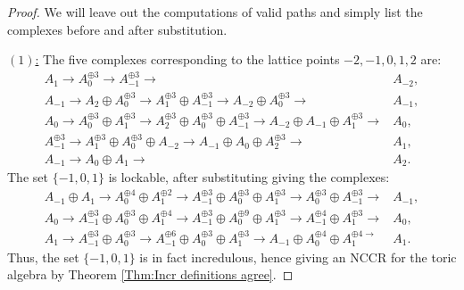 \documentclass[reqno, 12pt]{amsart}
\theoremstyle{definition}
\numberwithin{equation}{section}
\begin{document}
\begin{proof}
We will leave out the computations of valid paths and simply list the complexes before and after substitution.

\underline{$(1)$:} The five complexes corresponding to the lattice points $-2,-1,0,1,2$ are:\begin{align*}
 A_1\longrightarrow A_0^{\oplus 3}\longrightarrow A_{-1}^{\oplus 3}\longrightarrow&A_{-2},\\
A_{-1}\longrightarrow A_2\oplus A_0^{\oplus 3}\longrightarrow A_1^{\oplus 3}\oplus A_{-1}^{\oplus 3}\longrightarrow A_{-2}\oplus A_0^{\oplus 3}\longrightarrow&A_{-1},\\
A_0\longrightarrow A_0^{\oplus 3}\oplus A_1^{\oplus 3}\longrightarrow A_2^{\oplus 3}\oplus A_0^{\oplus 3}\oplus A_{-1}^{\oplus 3}\longrightarrow A_{-2}\oplus A_{-1}\oplus A_1^{\oplus 3}\longrightarrow&A_0,\\
 A_{-1}^{\oplus 3}\longrightarrow A_1^{\oplus 3}\oplus A_0^{\oplus 3}\oplus A_{-2}\longrightarrow A_{-1}\oplus A_0\oplus A_2^{\oplus 3}\longrightarrow&A_1,\\
 A_{-1}\longrightarrow A_0\oplus A_1\longrightarrow&A_2.
\end{align*} 
The set $\{-1,0,1\}$ is lockable, after substituting giving the complexes:
\begin{align*}
   A_{-1}\oplus A_1\longrightarrow A_0^{\oplus 4}\oplus A_1^{\oplus 2}\longrightarrow A_{-1}^{\oplus 3}\oplus A_0^{\oplus 3}\oplus A_1^{\oplus 3}\longrightarrow A_0^{\oplus 3}\oplus A_{-1}^{\oplus 3}\longrightarrow& A_{-1},\\
   A_0\longrightarrow A_{-1}^{\oplus 3}\oplus A_0^{\oplus 3}\oplus A_1^{\oplus 4}\longrightarrow A_{-1}^{\oplus 3}\oplus A_0^{\oplus 9}\oplus A_1^{\oplus 3}\longrightarrow A_{-1}^{\oplus 4}\oplus A_1^{\oplus 3} \longrightarrow&A_0,\\
  A_1\longrightarrow A_{-1}^{\oplus 3}\oplus A_0^{\oplus 3}\longrightarrow A_{-1}^{\oplus 6}\oplus A_0^{\oplus 3}\oplus A_1^{\oplus 3}\longrightarrow A_{-1}\oplus A_0^{\oplus 4}\oplus A_1^{\oplus 4\longrightarrow}&A_1.
\end{align*}
Thus, the set $\{-1,0,1\}$ is in fact incredulous, hence giving an NCCR for the toric algebra by Theorem \ref{Thm:Incr definitions agree}.


\end{proof}
\end{document}
